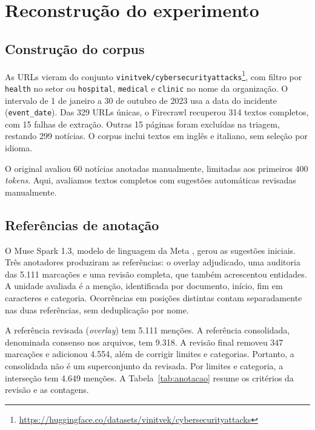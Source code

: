 \section{Reconstrução do experimento}
\label{sec:corpus}

\subsection{Construção do corpus}

As URLs vieram do conjunto \texttt{vinitvek/cybersecurityattacks}\footnote{\url{https://huggingface.co/datasets/vinitvek/cybersecurityattacks}}, com filtro por \texttt{health} no setor ou \texttt{hospital}, \texttt{medical} e \texttt{clinic} no nome da organização. O intervalo de 1 de janeiro a 30 de outubro de 2023 usa a data do incidente (\texttt{event\_date}). Das 329 URLs únicas, o Firecrawl recuperou 314 textos completos, com 15 falhas de extração. Outras 15 páginas foram excluídas na triagem, restando 299 notícias. O corpus inclui textos em inglês e italiano, sem seleção por idioma.

O original avaliou 60 notícias anotadas manualmente, limitadas aos primeiros 400 \textit{tokens}. Aqui, avaliamos textos completos com sugestões automáticas revisadas manualmente.

\subsection{Referências de anotação}

O Muse Spark 1.3, modelo de linguagem da Meta \cite{meta2026muse}, gerou as sugestões iniciais. Três anotadores produziram as referências: o overlay adjudicado, uma auditoria das 5.111 marcações e uma revisão completa, que também acrescentou entidades. A unidade avaliada é a menção, identificada por documento, início, fim em caracteres e categoria. Ocorrências em posições distintas contam separadamente nas duas referências, sem deduplicação por nome.

A referência revisada (\textit{overlay}) tem 5.111 menções. A referência consolidada, denominada consenso nos arquivos, tem 9.318. A revisão final removeu 347 marcações e adicionou 4.554, além de corrigir limites e categorias. Portanto, a consolidada não é um superconjunto da revisada. Por limites e categoria, a interseção tem 4.649 menções. A Tabela~\ref{tab:anotacao} resume os critérios da revisão e as contagens.



